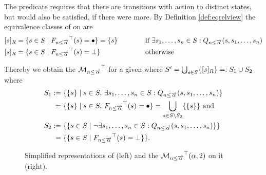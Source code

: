 \documentclass[preview]{standalone}
\begin{document}
The predicate \predminoutact requires that there are transitions with action \action to \numoutact distinct states, but would also be satisfied, if there were more.
\noindent By Definition \ref{def:eqrelview} the equivalence classes of \eqrelview on \states are 
\begin{alignat*}{3}
	\eqclassv &= \{\state \in \states \mid \gfctminoutaction(\state) = \remelem\} = \{\state\} \quad\quad\quad &&\text{if } \exists \state_1, \dots, \state_\numoutact \in \states: \predminoutact \\ 
	\eqclassv &= \{\state \in \states \mid \gfctminoutaction(\state) = \notppty\} &&\text{otherwise}
\end{alignat*}

\noindent Thereby we obtain the \viewN ${{{{{\mathcal{M}}}}_{{{n}\leq{\overrightarrow{\ensuremath{{\alpha}}}}}}}^{\top}}$ for a given \chgphN \chgph where ${S}' = \bigcup_{{s} \in {S}} \{{{[{s}]_{{R}}}}\} =: {S}_1 \cup {S}_2$ where 
\begin{align*}
	\states_1 &:= \{\{\state\} \mid \state \in \states,\, \exists \state_1, \dots, \state_\numoutact \in \states: \predminoutact\} \\
	&\;= \{\{\state\} \mid \state \in \states,\, \gfctminoutaction(\state) = \remelem\} = \nogroupstates \text{  and} \\
	\states_2 &:= \{\{\state \in \states \mid \lnot \exists \state_1, \dots, \state_\numoutact \in \states: \predminoutact\}\} \\
	&\;= \{\{\state \in \states \mid \gfctminoutaction(\state) = \notppty\}\}.
\end{align*}

\begin{figure}[!htb]
	\begin{minipage}{.5\textwidth}
		\hspace{5mm}
		
	\end{minipage}%
	\begin{minipage}{.5\textwidth}
		\hspace{5mm}
		
	\end{minipage}
	\caption{Simplified representations of \mdp (left) and the \viewN ${{{{{\mathcal{M}}}}_{{{n}\leq{\overrightarrow{\ensuremath{{\alpha}}}}}}}^{\top}}({\alpha},2)$ on it (right).}
	\label{fig:outActMinAfter} 
\end{figure}
\end{document}
